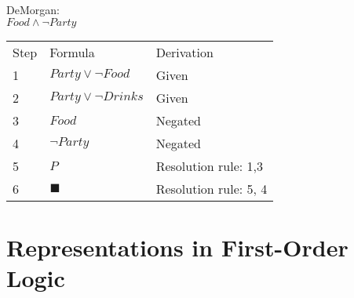 \documentclass[paper=a4, fontsize=11pt]{scrartcl} %
\numberwithin{equation}{section} %
\numberwithin{figure}{section} %
\numberwithin{table}{section} %
\begin{document}
\begin{enumerate}
\begin{enumerate}
		DeMorgan:\\
		
		$Food \wedge \neg Party$\\


		\begin{tabular}{lll}
		Step & Formula                     	& Derivation         \\
		1    & $Party \vee \neg Food$ 		& Given              \\
		2    & $Party \vee \neg Drinks$     & Given              \\
		3    & $Food$       				& Negated              \\
		4    & $\neg Party$       			& Negated              \\
		\hline
		5    & $P$             & Resolution rule: 1,3\\
		6   & $\blacksquare$              & Resolution rule: 5, 4\\               
		\end{tabular}
		
		\end{enumerate}
	\end{enumerate}

\section{Representations in First-Order Logic}
\end{document}
